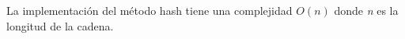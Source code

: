 La implementación del método hash tiene una complejidad $O(n)$ donde \emph{n} es la longitud de la cadena.